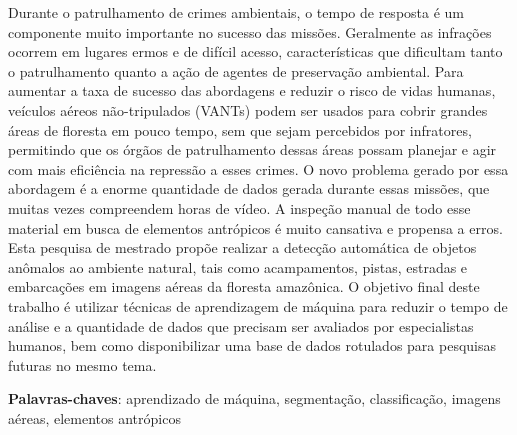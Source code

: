 \begin{resumo}
    Durante o patrulhamento de crimes ambientais, o tempo de resposta é um componente muito importante no sucesso das missões. Geralmente as infrações ocorrem em lugares ermos e de difícil acesso, características que dificultam tanto o patrulhamento quanto a ação de agentes de preservação ambiental. Para aumentar a taxa de sucesso das abordagens e reduzir o risco de vidas humanas, veículos aéreos não-tripulados (VANTs) podem ser usados para cobrir grandes áreas de floresta em pouco tempo, sem que sejam percebidos por infratores, permitindo que os órgãos de patrulhamento dessas áreas possam planejar e agir com mais eficiência na repressão a esses crimes. O novo problema gerado por essa abordagem é a enorme quantidade de dados gerada durante essas missões, que muitas vezes compreendem horas de vídeo. A inspeção manual de todo esse material em busca de elementos antrópicos é muito cansativa e propensa a erros. Esta pesquisa de mestrado propõe realizar a detecção automática de objetos anômalos ao ambiente natural, tais como acampamentos, pistas, estradas e embarcações em imagens aéreas da floresta amazônica. O objetivo final deste trabalho é utilizar técnicas de aprendizagem de máquina para reduzir o tempo de análise e a quantidade de dados que precisam ser avaliados por especialistas humanos, bem como disponibilizar uma base de dados rotulados para pesquisas futuras no mesmo tema.

    \vspace{\onelineskip}
    \noindent
    \textbf{Palavras-chaves}: aprendizado de máquina, segmentação, classificação, imagens aéreas, elementos antrópicos
\end{resumo}

